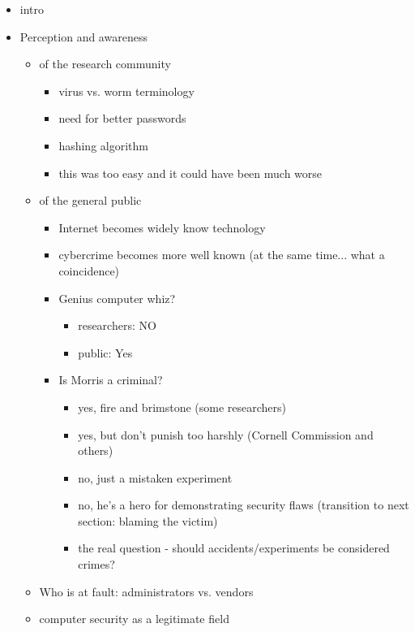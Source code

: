 \begin{enumerate}
\begin{itemize}
    \item intro
	\item Perception and awareness
		\begin{itemize}
		\item of the research community
        	\begin{itemize}
			\item virus vs. worm terminology
			\item need for better passwords
			\item hashing algorithm
            \item this was too easy and it could have been much worse
           	\end{itemize}
		\item of the general public
           	\begin{itemize}
   			\item Internet becomes widely know technology
            \item cybercrime becomes more well known (at the same time... what a coincidence)
            \item Genius computer whiz?
            	\begin{itemize}
            		\item researchers: NO	
            		\item public: Yes	
            	\end{itemize}
            \item Is Morris a criminal?
            	\begin{itemize}
                \item yes, fire and brimstone (some researchers)
                \item yes, but don't punish too harshly (Cornell Commission and others)
                \item no, just a mistaken experiment
                \item no, he's a hero for demonstrating security flaws (transition to next section: blaming the victim)
                \item the real question - should accidents/experiments be considered crimes?
            	\end{itemize}
           	\end{itemize}
            \item Who is at fault: administrators vs. vendors
		\item computer security as a legitimate field
        	\begin{itemize}

\end{itemize}
\end{itemize}
\end{itemize}
\end{enumerate}
